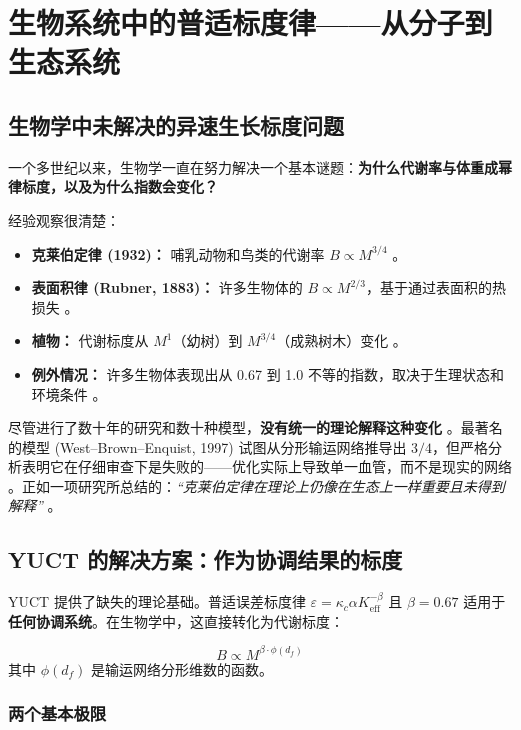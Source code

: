 \documentclass[12pt]{article}
\newcommand{\Keff}{K_{\mathrm{eff}}}
\begin{document}
	\section{生物系统中的普适标度律——从分子到生态系统}
	\label{sec:bio-scaling}
	
	\subsection{生物学中未解决的异速生长标度问题}
	
	一个多世纪以来，生物学一直在努力解决一个基本谜题：\textbf{为什么代谢率与体重成幂律标度，以及为什么指数会变化？}
	
	经验观察很清楚：
	\begin{itemize}
		\item \textbf{克莱伯定律 (1932)：} 哺乳动物和鸟类的代谢率 \(B \propto M^{3/4}\) \cite{Kleiber1932,West1997}。
		\item \textbf{表面积律 (Rubner, 1883)：} 许多生物体的 \(B \propto M^{2/3}\)，基于通过表面积的热损失 \cite{Rubner1883}。
		\item \textbf{植物：} 代谢标度从 \(M^{1}\)（幼树）到 \(M^{3/4}\)（成熟树木）变化 \cite{Reich2006}。
		\item \textbf{例外情况：} 许多生物体表现出从 0.67 到 1.0 不等的指数，取决于生理状态和环境条件 \cite{Glazier2005}。
	\end{itemize}
	
	尽管进行了数十年的研究和数十种模型，\textbf{没有统一的理论解释这种变化} \cite{Agutter2004}。最著名的模型 (West–Brown–Enquist, 1997) 试图从分形输运网络推导出 \(3/4\)，但严格分析表明它在仔细审查下是失败的——优化实际上导致单一血管，而不是现实的网络 \cite{Dodds2001}。正如一项研究所总结的：\textit{“克莱伯定律在理论上仍像在生态上一样重要且未得到解释”} \cite{Agutter2004}。
	
	\subsection{YUCT 的解决方案：作为协调结果的标度}
	
	YUCT 提供了缺失的理论基础。普适误差标度律 \(\varepsilon = \kappa_c \alpha \Keff^{-\beta}\) 且 \(\beta = 0.67\) 适用于\textbf{任何协调系统}。在生物学中，这直接转化为代谢标度：
	
	\begin{equation}
		B \propto M^{\beta \cdot \phi(d_f)}
	\end{equation}
	其中 \(\phi(d_f)\) 是输运网络分形维数的函数。
	
	\subsubsection{两个基本极限}
	
\end{document}
